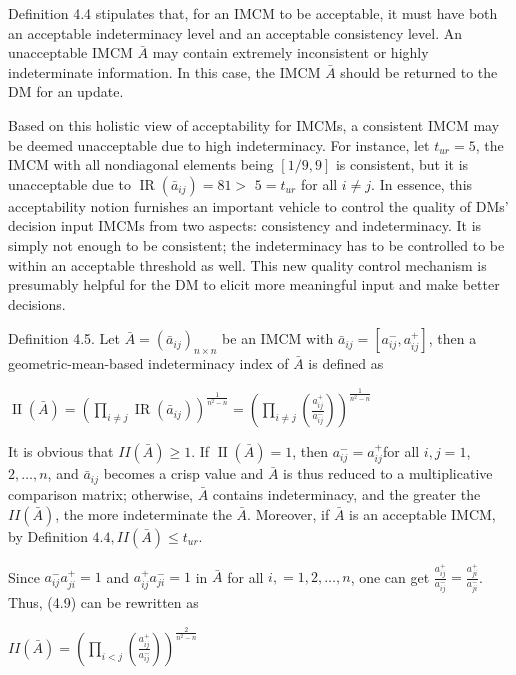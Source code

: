 \documentclass[10pt]{article}
\begin{document}
Definition 4.4 stipulates that, for an IMCM to be acceptable, it must have both an acceptable indeterminacy level and an acceptable consistency level. An unacceptable IMCM $\bar{A}$ may contain extremely inconsistent or highly indeterminate information. In this case, the IMCM $\bar{A}$ should be returned to the DM for an update.

Based on this holistic view of acceptability for IMCMs, a consistent IMCM may be deemed unacceptable due to high indeterminacy. For instance, let $t_{u r}=5$, the IMCM with all nondiagonal elements being $[1 / 9,9]$ is consistent, but it is unacceptable due to $\operatorname{IR}\left(\bar{a}_{i j}\right)=81>$ $5=t_{u r}$ for all $i \neq j$. In essence, this acceptability notion furnishes an
important vehicle to control the quality of DMs' decision input IMCMs from two aspects: consistency and indeterminacy. It is simply not enough to be consistent; the indeterminacy has to be controlled to be within an acceptable threshold as well. This new quality control mechanism is presumably helpful for the DM to elicit more meaningful input and make better decisions.

Definition 4.5. Let $\bar{A}=\left(\bar{a}_{i j}\right)_{n \times n}$ be an IMCM with $\bar{a}_{i j}=\left[a_{i j}^{-}, a_{i j}^{+}\right]$, then a geometric-mean-based indeterminacy index of $\bar{A}$ is defined as

$\operatorname{II}(\bar{A})=\left(\prod_{i \neq j} \operatorname{IR}\left(\bar{a}_{i j}\right)\right)^{\frac{1}{n^{2}-n}}=\left(\prod_{i \neq j}\left(\frac{a_{i j}^{+}}{a_{i j}^{-}}\right)\right)^{\frac{1}{n^{2}-n}}$

It is obvious that $I I(\bar{A}) \geq 1$. If $\operatorname{II}(\bar{A})=1$, then $a_{i j}^{-}=a_{i j}^{+}$for all $i, j=1$, $2, \ldots, n$, and $\bar{a}_{i j}$ becomes a crisp value and $\bar{A}$ is thus reduced to a multiplicative comparison matrix; otherwise, $\bar{A}$ contains indeterminacy, and the greater the $I I(\bar{A})$, the more indeterminate the $\bar{A}$. Moreover, if $\bar{A}$ is an acceptable IMCM, by Definition $4.4, I I(\bar{A}) \leq t_{u r}$.

Since $a_{i j}^{-} a_{j i}^{+}=1$ and $a_{i j}^{+} a_{j i}^{-}=1$ in $\bar{A}$ for all $i,=1,2, \ldots, n$, one can get $\frac{a_{i j}^{+}}{a_{i j}^{-}}=\frac{a_{j i}^{+}}{a_{j i}^{-}}$. Thus, (4.9) can be rewritten as

$I I(\bar{A})=\left(\prod_{i<j}\left(\frac{a_{i j}^{+}}{a_{i j}^{-}}\right)\right)^{\frac{2}{n^{2}-n}}$
\end{document}
